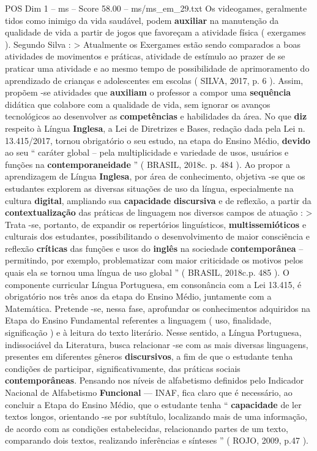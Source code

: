 \begin{textsample}{POS Dim 1 – ms – Score 58.00 – ms/ms\_em\_29.txt}
Os videogames, geralmente tidos como inimigo da vida saudável, podem \textbf{auxiliar} na manutenção da qualidade de vida a partir de jogos que favoreçam a atividade física ( exergames ).
Segundo Silva : > Atualmente os Exergames estão sendo comparados a boas atividades de movimentos e práticas, atividade de estímulo ao prazer de se praticar uma atividade e ao mesmo tempo de possibilidade de aprimoramento do aprendizado de crianças e adolescentes em escolas ( SILVA, 2017, p. 6 ).
Assim, propõem -se atividades que \textbf{auxiliam} o professor a compor uma \textbf{sequência} didática que colabore com a qualidade de vida, sem ignorar os avanços tecnológicos ao desenvolver as \textbf{competências} e habilidades da área.
No que \textbf{diz} respeito à Língua \textbf{Inglesa}, a Lei de Diretrizes e Bases, redação dada pela Lei n. 13.415/2017, tornou obrigatório o seu estudo, na etapa do Ensino Médio, \textbf{devido} ao seu “ caráter global – pela multiplicidade e variedade de usos, usuários e funções na \textbf{contemporaneidade} ” ( BRASIL, 2018c. p. 484 ).
Ao propor a aprendizagem de Língua \textbf{Inglesa}, por área de conhecimento, objetiva -se que os estudantes explorem as diversas situações de uso da língua, especialmente na cultura \textbf{digital}, ampliando sua \textbf{capacidade} \textbf{discursiva} e de reflexão, a partir da \textbf{contextualização} das práticas de linguagem nos diversos campos de atuação : > Trata -se, portanto, de expandir os repertórios linguísticos, \textbf{multissemióticos} e culturais dos estudantes, possibilitando o desenvolvimento de maior consciência e reflexão \textbf{críticas} das funções e usos do \textbf{inglês} na sociedade \textbf{contemporânea} – permitindo, por exemplo, problematizar com maior criticidade os motivos pelos quais ela se tornou uma língua de uso global ” ( BRASIL, 2018c.p. 485 ).
O componente curricular Língua Portuguesa, em consonância com a Lei 13.415, é obrigatório nos três anos da etapa do Ensino Médio, juntamente com a Matemática.
Pretende -se, nessa fase, aprofundar os conhecimentos adquiridos na Etapa do Ensino Fundamental referentes a linguagem ( uso, finalidade, significação ) e à leitura do texto literário.
Nesse sentido, a Língua Portuguesa, indissociável da Literatura, busca relacionar -se com as mais diversas linguagens, presentes em diferentes gêneros \textbf{discursivos}, a fim de que o estudante tenha condições de participar, significativamente, das práticas sociais \textbf{contemporâneas}.
Pensando nos níveis de alfabetismo definidos pelo Indicador Nacional de Alfabetismo \textbf{Funcional} — INAF, fica claro que é necessário, ao concluir a Etapa do Ensino Médio, que o estudante tenha “ \textbf{capacidade} de ler textos longos, orientando -se por subtítulo, localizando mais de uma informação, de acordo com as condições estabelecidas, relacionando partes de um texto, comparando dois textos, realizando inferências e sínteses ” ( ROJO, 2009, p.47 ).

\end{textsample}
